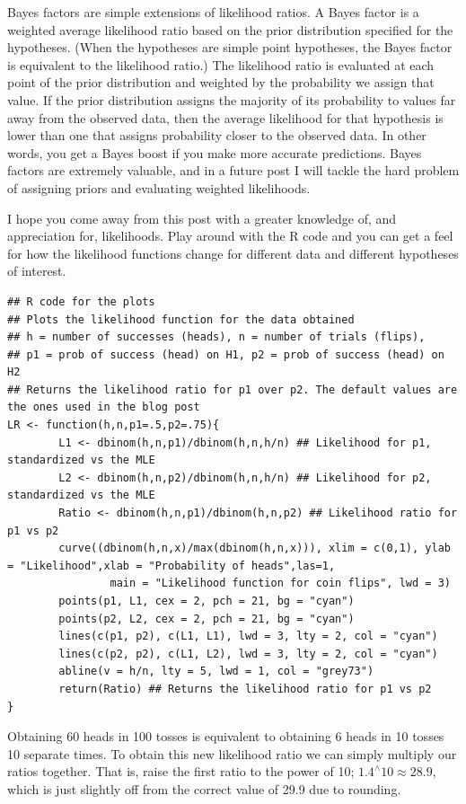 Bayes factors are simple extensions of likelihood ratios. A Bayes factor is a weighted average likelihood ratio based on the prior distribution specified for the hypotheses. (When the hypotheses are simple point hypotheses, the Bayes factor is equivalent to the likelihood ratio.) The likelihood ratio is evaluated at each point of the prior distribution and weighted by the probability we assign that value. If the prior distribution assigns the majority of its probability to values far away from the observed data, then the average likelihood for that hypothesis is lower than one that assigns probability closer to the observed data. In other words, you get a Bayes boost if you make more accurate predictions. Bayes factors are extremely valuable, and in a future post I will tackle the hard problem of assigning priors and evaluating weighted likelihoods.

I hope you come away from this post with a greater knowledge of, and appreciation for, likelihoods. Play around with the R code and you can get a feel for how the likelihood functions change for different data and different hypotheses of interest.


\begin{lstlisting}
## R code for the plots
## Plots the likelihood function for the data obtained
## h = number of successes (heads), n = number of trials (flips), 
## p1 = prob of success (head) on H1, p2 = prob of success (head) on H2
## Returns the likelihood ratio for p1 over p2. The default values are the ones used in the blog post
LR <- function(h,n,p1=.5,p2=.75){
        L1 <- dbinom(h,n,p1)/dbinom(h,n,h/n) ## Likelihood for p1, standardized vs the MLE
        L2 <- dbinom(h,n,p2)/dbinom(h,n,h/n) ## Likelihood for p2, standardized vs the MLE
        Ratio <- dbinom(h,n,p1)/dbinom(h,n,p2) ## Likelihood ratio for p1 vs p2
        curve((dbinom(h,n,x)/max(dbinom(h,n,x))), xlim = c(0,1), ylab = "Likelihood",xlab = "Probability of heads",las=1,
                main = "Likelihood function for coin flips", lwd = 3)
        points(p1, L1, cex = 2, pch = 21, bg = "cyan")
        points(p2, L2, cex = 2, pch = 21, bg = "cyan")
        lines(c(p1, p2), c(L1, L1), lwd = 3, lty = 2, col = "cyan")
        lines(c(p2, p2), c(L1, L2), lwd = 3, lty = 2, col = "cyan")
        abline(v = h/n, lty = 5, lwd = 1, col = "grey73")
        return(Ratio) ## Returns the likelihood ratio for p1 vs p2
}
\end{lstlisting}

Obtaining 60 heads in 100 tosses is equivalent to obtaining 6 heads in 10 tosses 10 separate times. To obtain this new likelihood ratio we can simply multiply our ratios together. That is, raise the first ratio to the power of 10; $1.4^{\wedge} 10 \approx 28.9$, which is just slightly off from the correct value of 29.9 due to rounding.

